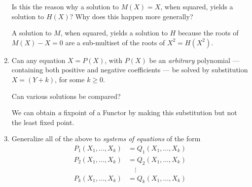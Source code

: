 \documentclass{scrartcl}
\begin{document}
\begin{enumerate}
  Is this the reason why a solution to $M(X)=X$, when squared, yields a solution to $H(X)$?
  Why does this happen more generally?
  
  A solution to $M$, when squared, yields a solution to $H$ because the roots of $M(X) - X = 0$ are a sub-multiset of the roots of $X^2 = H(X^2)$.
  
  \item Can any equation $X=P(X)$, with $P(X)$ be an \emph{arbitrary}
  polynomial --- containing both positive and negative coefficients ---
  be solved by substitution $X = (Y+k)$, for some $k \ge 0$.

  Can various solutions be compared?
  
  We can obtain \textit{a} fixpoint of a Functor by making this substitution but not the least fixed point.

  \item Generalize all of the above to \emph{systems of equations} of the form
  \begin{align*}
    P_1(X_1,\dots,X_k) &= Q_1(X_1,\dots,X_k)\\
    P_2(X_1,\dots,X_k) &= Q_2(X_1,\dots,X_k)\\
     &\quad \vdots \\
    P_k(X_1,\dots,X_k) &= Q_k(X_1,\dots,X_k)
  \end{align*}
\end{enumerate}
\end{document}
